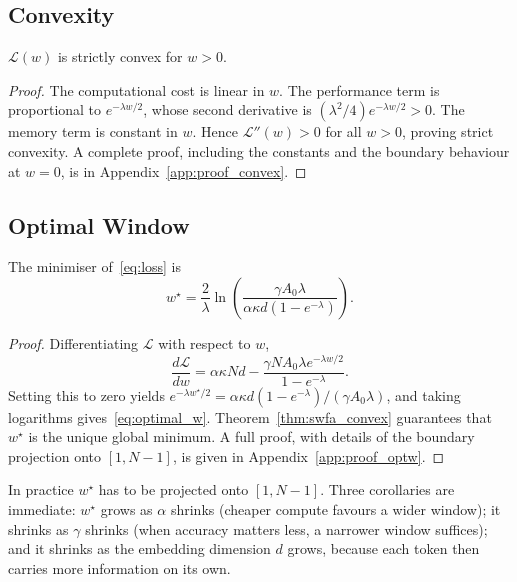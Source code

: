 \subsection{Convexity}\label{sec:swfa_convex}
\begin{theorem}\label{thm:swfa_convex}
$\mathcal{L}(w)$ is strictly convex for $w > 0$.
\end{theorem}
\begin{proof}
The computational cost is linear in $w$. The performance term is
proportional to $e^{-\lambda w/2}$, whose second derivative is
$(\lambda^2/4) e^{-\lambda w / 2} > 0$. The memory term is constant in
$w$. Hence $\mathcal{L}''(w) > 0$ for all $w > 0$, proving strict
convexity. A complete proof, including the constants and the boundary
behaviour at $w = 0$, is in Appendix~\ref{app:proof_convex}.
\end{proof}

\subsection{Optimal Window}\label{sec:swfa_opt}
\begin{theorem}\label{thm:swfa_optw}
The minimiser of~\eqref{eq:loss} is
\begin{equation}\label{eq:optimal_w}
w^{\star} = \frac{2}{\lambda}
  \ln\!\left(\frac{\gamma A_0 \lambda}
                   {\alpha \kappa d (1 - e^{-\lambda})}\right).
\end{equation}
\end{theorem}
\begin{proof}
Differentiating $\mathcal{L}$ with respect to $w$,
\[
\frac{d\mathcal{L}}{dw} =
\alpha \kappa N d -
\frac{\gamma N A_0 \lambda e^{-\lambda w / 2}}{1 - e^{-\lambda}}.
\]
Setting this to zero yields
$e^{-\lambda w^{\star}/2} = \alpha \kappa d (1 - e^{-\lambda})
/ (\gamma A_0 \lambda)$, and taking logarithms
gives~\eqref{eq:optimal_w}. Theorem~\ref{thm:swfa_convex} guarantees
that $w^{\star}$ is the unique global minimum. A full proof, with
details of the boundary projection onto $[1, N-1]$, is given in
Appendix~\ref{app:proof_optw}.
\end{proof}

In practice $w^{\star}$ has to be projected onto $[1, N-1]$.
Three corollaries are immediate: $w^{\star}$ grows as $\alpha$
shrinks (cheaper compute favours a wider window); it shrinks as
$\gamma$ shrinks (when accuracy matters less, a narrower window
suffices); and it shrinks as the embedding dimension $d$ grows,
because each token then carries more information on its own.

